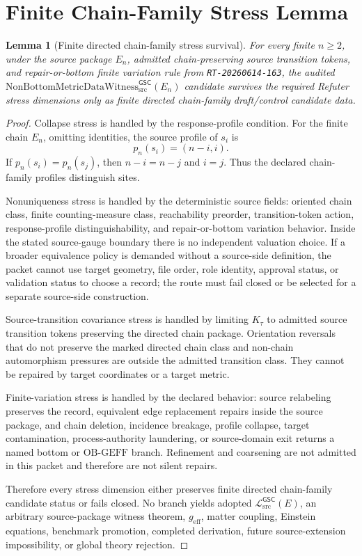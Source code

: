 \documentclass[11pt]{article}
\newcommand{\Witness}{\mathrm{NonBottomMetricDataWitness}_{\mathrm{src}}^{\mathsf{GSC}}}
\newcommand{\MetricData}{\mathcal{L}_{\mathrm{src}}^{\mathsf{GSC}}}
\newcommand{\OBGEFF}{\mathrm{OB\mbox{-}GEFF}}
\newcommand{\geff}{g_{\mathrm{eff}}}
\newcommand{\En}{E_n}
\newtheorem{lemma}{Lemma}
\begin{document}
\section{Finite Chain-Family Stress Lemma}

\begin{lemma}[Finite directed chain-family stress survival]
For every finite \(n\ge 2\), under the source package \(\En\), admitted
chain-preserving source transition tokens, and repair-or-bottom finite
variation rule from \texttt{RT-20260614-163}, the audited
\(\Witness(\En)\) candidate survives the required Refuter stress dimensions
only as finite directed chain-family draft/control candidate data.
\end{lemma}

\begin{proof}
Collapse stress is handled by the response-profile condition. For the finite
chain \(\En\), omitting identities, the source profile of \(s_i\) is
\[
  p_n(s_i)=(n-i,i).
\]
If \(p_n(s_i)=p_n(s_j)\), then \(n-i=n-j\) and \(i=j\). Thus the declared
chain-family profiles distinguish sites.

Nonuniqueness stress is handled by the deterministic source fields: oriented
chain class, finite counting-measure class, reachability preorder,
transition-token action, response-profile distinguishability, and
repair-or-bottom variation behavior. Inside the stated source-gauge boundary
there is no independent valuation choice. If a broader equivalence policy is
demanded without a source-side definition, the packet cannot use target
geometry, file order, role identity, approval status, or validation status to
choose a record; the route must fail closed or be selected for a separate
source-side construction.

Source-transition covariance stress is handled by limiting \(K_{\tau}\) to
admitted source transition tokens preserving the directed chain package.
Orientation reversals that do not preserve the marked directed chain class
and non-chain automorphism pressures are outside the admitted transition
class. They cannot be repaired by target coordinates or a target metric.

Finite-variation stress is handled by the declared behavior: source relabeling
preserves the record, equivalent edge replacement repairs inside the source
package, and chain deletion, incidence breakage, profile collapse, target
contamination, process-authority laundering, or source-domain exit returns a
named bottom or \(\OBGEFF\) branch. Refinement and coarsening are not admitted
in this packet and therefore are not silent repairs.

Therefore every stress dimension either preserves finite directed
chain-family candidate status or fails closed. No branch yields adopted
\(\MetricData(E)\), an arbitrary source-package witness theorem, \(\geff\),
matter coupling, Einstein equations, benchmark promotion, completed
derivation, future source-extension impossibility, or global theory rejection.
\end{proof}
\end{document}
